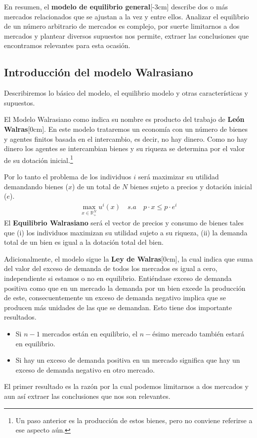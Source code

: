 En resumen, el \textbf{modelo de equilibrio general}[-3cm] describe dos o más mercados relacionados que se ajustan a la vez y entre ellos. Analizar el equilibrio de un número arbitrario de mercados es complejo, por suerte limitarnos a dos mercados y plantear diversos supuestos nos permite, extraer las conclusiones que encontramos relevantes para esta ocasión. 

\subsection{Introducción del modelo Walrasiano}

Describiremos lo básico del modelo, el equilibrio modelo y otras características y supuestos. 

El Modelo Walrasiano como indica su nombre es producto del trabajo de \textbf{León Walras}[0cm]. En este modelo trataremos un economía con un número de bienes y agentes finitos basada en el intercambio, es decir, no hay dinero. Como no hay dinero los agentes se intercambian bienes y su riqueza se determina por el valor de su dotación inicial.\footnote{Un paso anterior es la producción de estos bienes, pero no conviene referirse a ese aspecto aún.}

Por lo tanto el problema de los individuos $i$ será maximizar su utilidad demandando bienes ($x$) de un total de $N$ bienes sujeto a precios y dotación inicial ($e$).
\begin{align*}
    \max_{x \in \mathbb{R}^N_+}u^i (x) \quad s.a \quad p\cdot x \leq p\cdot e^i
\end{align*}
El \textbf{Equilibrio Walrasiano} será el vector de precios y consumo de bienes tales que (i) los individuos maximizan su utilidad sujeto a su riqueza, (ii) la demanda total de un bien es igual a la dotación total del bien.

Adicionalmente, el modelo sigue la \textbf{Ley de Walras}[0cm], la cual indica que suma del valor del exceso de demanda de todos los mercados es igual a cero, independiente si estamos o no en equilibrio. Entiéndase exceso de demanda positiva como que en un mercado la demanda por un bien excede la producción de este, consecuentemente un exceso de demanda negativo implica que se producen más unidades de las que se demandan. Esto tiene dos importante resultados.
\begin{itemize}
    \item Si $n-1$ mercados están en equilibrio, el $n-$ésimo mercado también estará en equilibrio.
    \item Si hay un exceso de demanda positiva en un mercado significa que hay un exceso de demanda negativo en otro mercado.
\end{itemize}
El primer resultado es la razón por la cual podemos limitarnos a dos mercados y aun así extraer las conclusiones que nos son relevantes.

